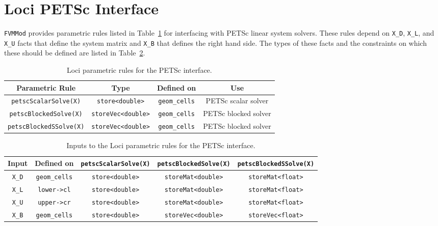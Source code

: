 \documentclass{article}
\begin{document}
\section{Loci PETSc Interface}
\texttt{FVMMod} provides parametric rules listed in
Table~\ref{tbl:Loci-PETSc-Rules} for interfacing with PETSc linear
system solvers. These rules depend on \texttt{X\_D}, \texttt{X\_L},
and \texttt{X\_U} facts that define the system matrix and
\texttt{X\_B} that defines the right hand side. The types of these
facts and the constraints on which these should be defined are listed
in Table~\ref{tbl:Loci-PETSc-Rule-Inputs}.
\begin{table}[H]
    \centering
    \begin{tabular}{c|c|c|c}
        \hline
        Parametric Rule & Type & Defined on & Use \\
        \hline
        \texttt{petscScalarSolve(X)} &  \texttt{store<double>} & \texttt{geom\_cells} & PETSc scalar solver \\
        \texttt{petscBlockedSolve(X)} &  \texttt{storeVec<double>} & \texttt{geom\_cells} & PETSc blocked solver \\
        \texttt{petscBlockedSSolve(X)} &  \texttt{storeVec<double>} & \texttt{geom\_cells} & PETSc blocked solver \\
    \end{tabular}
    \caption{Loci parametric rules for the PETSc interface.}
    \label{tbl:Loci-PETSc-Rules}
\end{table}
\begin{table}[H]
    \centering
    \begin{tabular}{c|c|c|c|c}
        Input & Defined on & \texttt{petscScalarSolve(X)} & \texttt{petscBlockedSolve(X)} & \texttt{petscBlockedSSolve(X)} \\
        \hline
        \texttt{X\_D} & \texttt{geom\_cells} & \texttt{store<double>} & \texttt{storeMat<double>} & \texttt{storeMat<float>} \\
        \texttt{X\_L} & \texttt{lower->cl} & \texttt{store<double>} & \texttt{storeMat<double>} & \texttt{storeMat<float>} \\
        \texttt{X\_U} & \texttt{upper->cr} & \texttt{store<double>} & \texttt{storeMat<double>} & \texttt{storeMat<float>} \\
        \texttt{X\_B} & \texttt{geom\_cells} & \texttt{store<double>} & \texttt{storeVec<double>} & \texttt{storeVec<float>} \\
    \end{tabular}
    \caption{Inputs to the Loci parametric rules for the PETSc interface.}
    \label{tbl:Loci-PETSc-Rule-Inputs}
\end{table}
\end{document}
